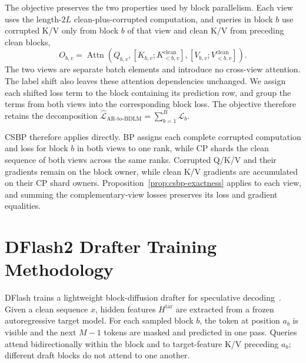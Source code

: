 The objective preserves the two properties used by block parallelism. Each
view uses the length-$2L$ clean-plus-corrupted computation, and queries in
block $b$ use corrupted K/V only from block $b$ of that view and clean K/V
from preceding clean blocks,
\begin{equation}
    O_{b,v}
    =\operatorname{Attn}\!\left(
      Q_{b,v},
      [K_{b,v};K_{<b,v}^{\mathrm{clean}}],
      [V_{b,v};V_{<b,v}^{\mathrm{clean}}]
    \right).
    \label{eq:fast-dllm-v2-attention}
\end{equation}
The two views are separate batch elements and introduce no cross-view
attention. The label shift also leaves these attention dependencies unchanged.
We assign each shifted loss term to the block containing its prediction row,
and group the terms from both views into the corresponding block loss. The
objective therefore retains the decomposition
$\widehat{\mathcal{L}}_{\mathrm{AR\mbox{-}to\mbox{-}BDLM}}
=\sum_{b=1}^{B}\mathcal{L}_b$.

CSBP therefore applies directly. BP assigns each complete corrupted
computation and loss for block $b$ in both views to one rank, while CP shards
the clean sequence of both views across the same ranks.
Corrupted Q/K/V and their gradients remain on the block owner, while clean K/V
gradients are accumulated on their CP shard owners.
Proposition~\ref{prop:csbp-exactness}
applies to each view, and summing the complementary-view losses preserves its
loss and gradient equalities.

\clearpage
\section{DFlash2 Drafter Training Methodology}
\label{app:dflash2-objective}

DFlash trains a lightweight block-diffusion drafter for speculative
decoding~\citep{chen2026dflash}. Given a clean sequence $x$, hidden features
$H^{\mathrm{tar}}$ are extracted from a frozen autoregressive target model.
For each sampled block $b$, the token at position $a_b$ is visible and the next
$M-1$ tokens are masked and predicted in one pass. Queries attend
bidirectionally within the block and to target-feature K/V preceding $a_b$;
different draft blocks do not attend to one another.

